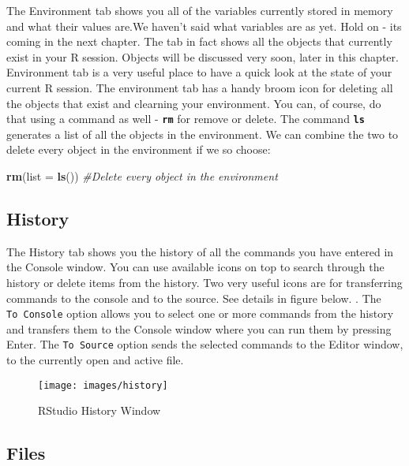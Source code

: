 \documentclass[
]{krantz}
\makeatletter
\newenvironment{Shaded}{\begin{snugshade}}{\end{snugshade}}
\newcommand{\CommentTok}[1]{\textcolor[rgb]{0.37,0.37,0.37}{\textit{#1}}}
\newcommand{\DataTypeTok}[1]{\textcolor[rgb]{0.27,0.27,0.27}{#1}}
\newcommand{\KeywordTok}[1]{\textcolor[rgb]{0.27,0.27,0.27}{\textbf{#1}}}
\newcommand{\NormalTok}[1]{#1}
\newenvironment{kframe}{%
\medskip{}
\setlength{\fboxsep}{.8em}
 \def\at@end@of@kframe{}%
 \ifinner\ifhmode%
  \def\at@end@of@kframe{\end{minipage}}%
  \begin{minipage}{\columnwidth}%
 \fi\fi%
 \def\FrameCommand##1{\hskip\@totalleftmargin \hskip-\fboxsep
 \colorbox{shadecolor}{##1}\hskip-\fboxsep
     \hskip-\linewidth \hskip-\@totalleftmargin \hskip\columnwidth}%
 \MakeFramed {\advance\hsize-\width
   \@totalleftmargin\z@ \linewidth\hsize
   \@setminipage}}%
 {\par\unskip\endMakeFramed%
 \at@end@of@kframe}
\renewenvironment{Shaded}{\begin{kframe}}{\end{kframe}}
\makeatother
\begin{document}
The Environment tab shows you all of the variables currently stored in memory and what their values are.We haven't said what variables are as yet. Hold on - its coming in the next chapter. The tab in fact shows all the objects that currently exist in your R session. Objects will be discussed very soon, later in this chapter. Environment tab is a very useful place to have a quick look at the state of your current R session. The environment tab has a handy broom icon for deleting all the objects that exist and clearning your environment. You can, of course, do that using a command as well - \textbf{\texttt{rm}} for remove or delete. The command \textbf{\texttt{ls}} generates a list of all the objects in the environment. We can combine the two to delete every object in the environment if we so choose:

\begin{Shaded}
\begin{Highlighting}[]
\KeywordTok{rm}\NormalTok{(}\DataTypeTok{list =} \KeywordTok{ls}\NormalTok{()) }\CommentTok{#Delete every object in the environment}
\end{Highlighting}
\end{Shaded}

\hypertarget{history}{%
\subsection{History}\label{history}}

The History tab shows you the history of all the commands you have entered in the Console window. You can use available icons on top to search through the history or delete items from the history. Two very useful icons are for transferring commands to the console and to the source. See details in figure below. . The \texttt{To\ Console} option allows you to select one or more commands from the history and transfers them to the Console window where you can run them by pressing Enter. The \texttt{To\ Source} option sends the selected commands to the Editor window, to the currently open and active file.

\begin{figure}

{\centering \texttt{[image: images/history]} 

}

\caption{RStudio History Window}\label{fig:unnamed-chunk-5}
\end{figure}

\hypertarget{files}{%
\subsection{Files}\label{files}}
\end{document}
